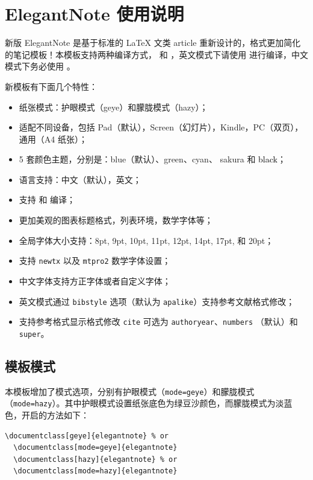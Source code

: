 
\section{ElegantNote 使用说明}

新版 ElegantNote 是基于标准的 \LaTeX{} 文类 article 重新设计的，格式更加简化的笔记模板！本模板支持两种编译方式， 和 ，英文模式下请使用  进行编译，中文模式下务必使用 。

新模板有下面几个特性：

\begin{itemize}
  \item 纸张模式：护眼模式（geye）和朦胧模式（hazy）；
  \item 适配不同设备，包括 Pad（默认），Screen（幻灯片），Kindle，PC（双页），通用（A4 纸张）；
  \item 5 套颜色主题，分别是：\textcolor{eblue}{blue}（默认）、\textcolor{egreen}{green}、\textcolor{ecyan}{cyan}、 \textcolor{sakura}{sakura} 和 \textcolor{black}{black}；
  \item 语言支持：中文（默认），英文；
  \item 支持  和  编译；
  \item 更加美观的图表标题格式，列表环境，数学字体等；
  \item 全局字体大小支持：8pt, 9pt, 10pt, 11pt, 12pt, 14pt, 17pt, 和 20pt；
  \item 支持 \lstinline{newtx} 以及 \lstinline{mtpro2} 数学字体设置； 
  \item 中文字体支持方正字体或者自定义字体；
  \item 英文模式通过 \lstinline{bibstyle} 选项（默认为 \lstinline{apalike}）支持参考文献格式修改；
  \item 支持参考格式显示格式修改 \lstinline{cite} 可选为 \lstinline{authoryear}、\lstinline{numbers} （默认）和 \lstinline{super}。
\end{itemize}

\subsection{模板模式}

本模板增加了模式选项，分别有护眼模式（\lstinline{mode=geye}）和朦胧模式（\lstinline{mode=hazy}）。其中护眼模式设置纸张底色为绿豆沙颜色，而朦胧模式为淡蓝色，开启的方法如下：
\begin{lstlisting}[frame=none]  
  \documentclass[geye]{elegantnote} % or
  \documentclass[mode=geye]{elegantnote}
  \documentclass[hazy]{elegantnote} % or
  \documentclass[mode=hazy]{elegantnote}
\end{lstlisting}

